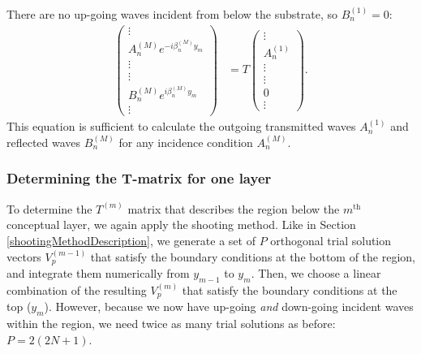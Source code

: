 There are no up-going waves incident from below the substrate, so $B^{(1)}_n = 0$:
\begin{align}
\left(\begin{array}{c}\vdots \\ A^{(M)}_n  e^{-i \beta^{(M)}_n y_m} \\ \vdots \\\hline \vdots \\ B^{(M)}_n e^{i \beta^{(M)}_n y_m} \\ \vdots\end{array}\right)  &= T \left(\begin{array}{c}\vdots \\ A^{(1)}_n \\ \vdots \\\hline \vdots \\ 0 \\ \vdots\end{array}\right).
\label{tMatrixFullStack}
\end{align}
This equation is sufficient to calculate the outgoing transmitted waves $A^{(1)}_n$ and reflected waves $B^{(M)}_n$ for any incidence condition $A_n^{(M)}$.

\subsubsection{Determining the T-matrix for one layer}
To determine the $T^{(m)}$ matrix that describes the region below the $m^\textrm{th}$ conceptual layer, we again apply the shooting method.  Like in Section \ref{shootingMethodDescription}, we generate a set of $P$ orthogonal trial solution vectors $V^{(m-1)}_p$ that satisfy the boundary conditions at the bottom of the region, and integrate them numerically from $y_{m-1}$ to $y_{m}$.  Then, we choose a linear combination of the resulting $V^{(m)}_p$ that satisfy the boundary conditions at the top ($y_m$).  However, because we now have up-going \emph{and} down-going incident waves within the region, we need twice as many trial solutions as before: $P=2(2N+1)$.

